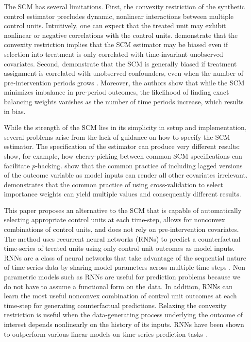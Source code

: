 \documentclass[hidelinks,12pt]{article}
\begin{document}
The SCM has several limitations. First, the convexity restriction of the synthetic control estimator precludes dynamic, nonlinear interactions between multiple control units. Intuitively, one can expect that the treated unit may exhibit nonlinear or negative correlations with the control units. \citet{ferman2016revisiting} demonstrate that the convexity restriction implies that the SCM estimator may be biased even if selection into treatment is only correlated with time-invariant unobserved covariates. Second, \citet{ferman2018synthetic} demonstrate that the SCM is generally biased if treatment assignment is correlated with unobserved confounders, even when the number of pre-intervention periods grows \citep{ferman2018synthetic}. Moreover, the authors show that while the SCM minimizes imbalance in pre-period outcomes, the likelihood of finding exact balancing weights vanishes as the number of time periods increase, which results in bias. 

While the strength of the SCM lies in its simplicity in setup and implementation, several problems arise from the lack of guidance on how to specify the SCM estimator. The specification of the estimator can produce very different results: \citet{ferman2018cherry} show, for example, how cherry-picking between common SCM specifications can facilitate $p$-hacking.\citet{kaul2015synthetic} show that the common practice of including lagged versions of the outcome variable as model inputs can render all other covariates irrelevant. \citet{klossner2017comparative} demonstrates that the common practice of using cross-validation to select importance weights can yield multiple values and consequently different results. 

This paper proposes an alternative to the SCM that is capable of automatically selecting appropriate control units at each time-step, allows for nonconvex combinations of control units, and does not rely on pre-intervention covariates. The method uses recurrent neural networks (RNNs) to predict a counterfactual time-series of treated units using only control unit outcomes as model inputs. RNNs are a class of neural networks that take advantage of the sequential nature of time-series data by sharing model parameters across multiple time-steps \citep{el1995}. Non-parametric models such as RNNs are useful for prediction problems because we do not have to assume a functional form on the data. In addition, RNNs can learn the most useful nonconvex combination of control unit outcomes at each time-step for generating counterfactual predictions. Relaxing the convexity restriction is useful when the data-generating process underlying the outcome of interest depends nonlinearly on the history of its inputs. RNNs have been shown to outperform various linear models on time-series prediction tasks \citep{cinar2017position}. 
\end{document}
